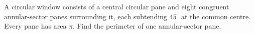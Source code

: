 A circular window consists of a central circular pane and eight congruent annular-sector panes surrounding it, each subtending $45^\circ$ at the common centre. Every pane has area $\pi$. Find the perimeter of one annular-sector pane.
